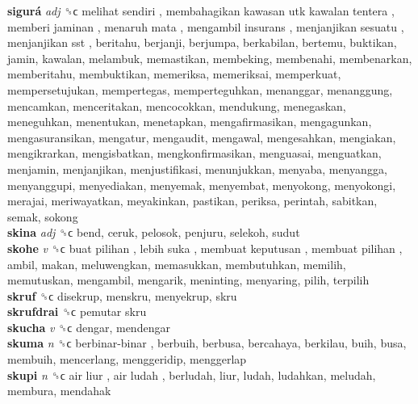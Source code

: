 \textbf{sigurá} \emph{adj}  ␝ϲ   melihat sendiri ,  membahagikan kawasan utk kawalan tentera ,  memberi jaminan ,  menaruh mata ,  mengambil insurans ,  menjanjikan sesuatu ,  menjanjikan sst , beritahu, berjanji, berjumpa, berkabilan, bertemu, buktikan, jamin, kawalan, melambuk, memastikan, membeking, membenahi, membenarkan, memberitahu, membuktikan, memeriksa, memeriksai, memperkuat, mempersetujukan, mempertegas, memperteguhkan, menanggar, menanggung, mencamkan, menceritakan, mencocokkan, mendukung, menegaskan, meneguhkan, menentukan, menetapkan, mengafirmasikan, mengagunkan, mengasuransikan, mengatur, mengaudit, mengawal, mengesahkan, mengiakan, mengikrarkan, mengisbatkan, mengkonfirmasikan, menguasai, menguatkan, menjamin, menjanjikan, menjustifikasi, menunjukkan, menyaba, menyangga, menyanggupi, menyediakan, menyemak, menyembat, menyokong, menyokongi, merajai, meriwayatkan, meyakinkan, pastikan, periksa, perintah, sabitkan, semak, sokong  \\
\textbf{skina} \emph{adj}  ␝ϲ  bend, ceruk, pelosok, penjuru, selekoh, sudut  \\
\textbf{skohe} \emph{v}  ␝ϲ   buat pilihan ,  lebih suka ,  membuat keputusan ,  membuat pilihan , ambil, makan, meluwengkan, memasukkan, membutuhkan, memilih, memutuskan, mengambil, mengarik, meninting, menyaring, pilih, terpilih  \\
\textbf{skruf} ␝ϲ  disekrup, menskru, menyekrup, skru  \\
\textbf{skrufdrai} ␝ϲ   pemutar skru   \\
\textbf{skucha} \emph{v}  ␝ϲ  dengar, mendengar  \\
\textbf{skuma} \emph{n}  ␝ϲ   berbinar-binar , berbuih, berbusa, bercahaya, berkilau, buih, busa, membuih, mencerlang, menggeridip, menggerlap  \\
\textbf{skupi} \emph{n}  ␝ϲ   air liur ,  air ludah , berludah, liur, ludah, ludahkan, meludah, membura, mendahak  \\

